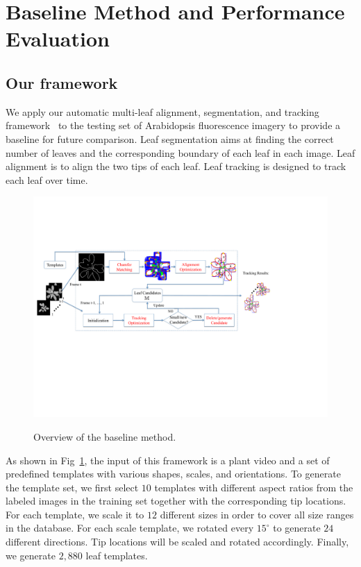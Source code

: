 \section{Baseline Method and Performance Evaluation}
\label{sec:baseline}
\subsection{Our framework}
We apply our automatic multi-leaf alignment, segmentation, and tracking framework~\cite{yin2014a,yin2014b} to the testing set of Arabidopsis fluorescence imagery to provide a baseline for future comparison.
Leaf segmentation aims at finding the correct number of leaves and the corresponding boundary of each leaf in each image.
Leaf alignment is to align the two tips of each leaf.
Leaf tracking is designed to track each leaf over time.


\begin{figure}[h]
\centering
\includegraphics[width=.98\textwidth]{Figures/overview}\\
\caption{Overview of the baseline method.}
\label{fig:methodOverview}
\end{figure}

As shown in Fig~\ref{fig:methodOverview}, the input of this framework is a plant video and a set of predefined templates with various shapes, scales, and orientations.
To generate the template set, we first select $10$ templates with different aspect ratios from the labeled images in the training set together with the corresponding tip locations.
For each template, we scale it to $12$ different sizes in order to cover all size ranges in the database.
For each scale template, we rotated every $15^{\circ}$ to generate $24$ different directions.
Tip locations will be scaled and rotated accordingly.
Finally, we generate $2,880$ leaf templates.


